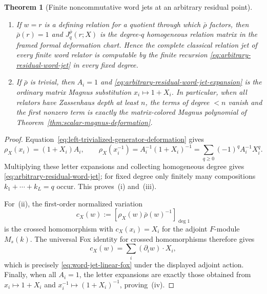 \documentclass[11pt]{article}
\newtheorem{theorem}{Theorem}[section]
\theoremstyle{definition}
\begin{document}
\begin{theorem}[Finite noncommutative word jets at an arbitrary residual point]
\begin{enumerate}[label=\textnormal{(\roman*)}]
\item If $w=r$ is a defining relation for a quotient through which
$\bar\rho$ factors, then $\bar\rho(r)=1$ and
$J_q^{\bar\rho}(r;X)$ is the degree-$q$ homogeneous relation matrix in the
framed formal deformation chart.  Hence the complete classical relation jet
of every finite word relator is computable by the finite recursion
\eqref{eq:arbitrary-residual-word-jet} in every fixed degree.

\item If $\bar\rho$ is trivial, then $A_i=1$ and
\eqref{eq:arbitrary-residual-word-jet-expansion} is the ordinary matrix
Magnus substitution $x_i\mapsto1+X_i$.  In particular, when all relators have
Zassenhaus depth at least $n$, the terms of degree $<n$ vanish and the
first nonzero term is exactly the matrix-colored Magnus polynomial of
Theorem~\ref{thm:scalar-magnus-deformation}.
\end{enumerate}
\end{theorem}

\begin{proof}
Equation~\eqref{eq:left-trivialized-generator-deformation} gives
\[
 \rho_X(x_i)=(1+X_i)A_i,
 \qquad
 \rho_X(x_i^{-1})=A_i^{-1}(1+X_i)^{-1}
 =\sum_{q\ge0}(-1)^qA_i^{-1}X_i^q.
\]
Multiplying these letter expansions and collecting homogeneous degree gives
\eqref{eq:arbitrary-residual-word-jet}; for fixed degree only finitely many
compositions $k_1+\cdots+k_L=q$ occur.  This proves~(i) and~(iii).

For~(ii), the first-order normalized variation
\[
 c_X(w):=[\rho_X(w)\bar\rho(w)^{-1}]_{\deg1}
\]
is the crossed homomorphism with $c_X(x_i)=X_i$ for the adjoint
$F$-module $M_s(k)$.  The universal Fox identity for crossed homomorphisms \cite{Fox}
therefore gives
\[
 c_X(w)=\sum_i(\partial_iw)\cdot X_i,
\]
which is precisely \eqref{eq:word-jet-linear-fox} under the displayed
adjoint action.  Finally, when all $A_i=1$, the letter expansions are exactly
those obtained from $x_i\mapsto1+X_i$ and
$x_i^{-1}\mapsto(1+X_i)^{-1}$, proving~(iv).
\end{proof}
\end{document}
